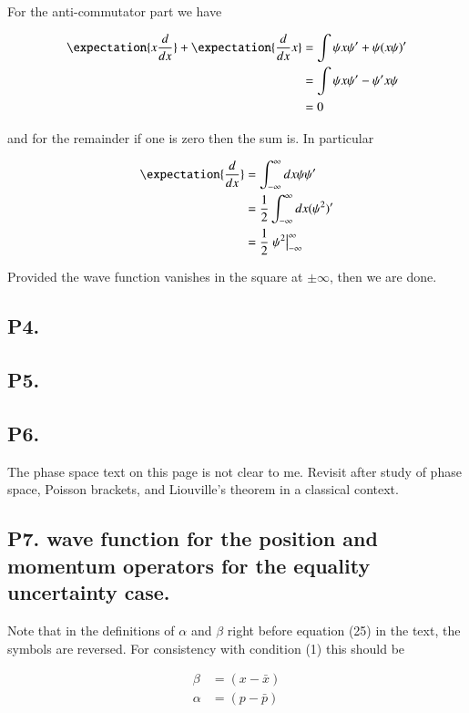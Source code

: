 \documentclass{article}
\begin{document}
For the anti-commutator part we have

\begin{align*}
\expectation{x \frac{d}{dx}} + \expectation{\frac{d}{dx} x} 
&=
\int \psi x \psi' + \psi (x \psi)' \\
&=
\int \psi x \psi' - \psi' x \psi \\
&= 0
\end{align*}

and for the remainder if one is zero then the sum is.  In particular

\begin{align*}
\expectation{\frac{d}{dx}} 
&= \int_{-\infty}^\infty dx \psi \psi' \\
&= \inv{2} \int_{-\infty}^\infty dx (\psi^2)' \\
&= \inv{2} \left. \psi^2 \right\vert_{-\infty}^\infty
\end{align*}

Provided the wave function vanishes in the square at $\pm \infty$, then we are done.

\subsection{P4. }
\subsection{P5. }
\subsection{P6. }

The phase space text on this page is not clear to me.  Revisit after study
of phase space, Poisson brackets, and Liouville's theorem in a classical
context.

\subsection{P7. wave function for the position and momentum operators for the equality uncertainty case. }

Note that in the definitions of $\alpha$ and $\beta$ right before equation (25) in the text, the symbols are reversed.  For consistency with condition (1)
this should be

\begin{align*}
\beta &= (x - \bar{x}) \\
\alpha &= (p - \bar{p})
\end{align*}
\end{document}
